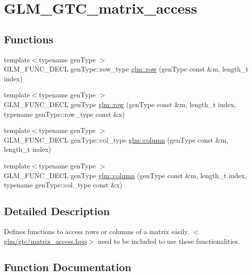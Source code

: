 \hypertarget{group__gtc__matrix__access}{}\section{G\+L\+M\+\_\+\+G\+T\+C\+\_\+matrix\+\_\+access}
\label{group__gtc__matrix__access}
\subsection*{Functions}
\begin{DoxyCompactItemize}
\item 
{\footnotesize template$<$typename gen\+Type $>$ }\\G\+L\+M\+\_\+\+F\+U\+N\+C\+\_\+\+D\+E\+CL gen\+Type\+::row\+\_\+type \hyperlink{group__gtc__matrix__access_ga259e5ebd0f31ec3f83440f8cae7f5dba}{glm\+::row} (gen\+Type const \&m, length\+\_\+t index)
\item 
{\footnotesize template$<$typename gen\+Type $>$ }\\G\+L\+M\+\_\+\+F\+U\+N\+C\+\_\+\+D\+E\+CL gen\+Type \hyperlink{group__gtc__matrix__access_gaadcc64829aadf4103477679e48c7594f}{glm\+::row} (gen\+Type const \&m, length\+\_\+t index, typename gen\+Type\+::row\+\_\+type const \&x)
\item 
{\footnotesize template$<$typename gen\+Type $>$ }\\G\+L\+M\+\_\+\+F\+U\+N\+C\+\_\+\+D\+E\+CL gen\+Type\+::col\+\_\+type \hyperlink{group__gtc__matrix__access_ga96022eb0d3fae39d89fc7a954e59b374}{glm\+::column} (gen\+Type const \&m, length\+\_\+t index)
\item 
{\footnotesize template$<$typename gen\+Type $>$ }\\G\+L\+M\+\_\+\+F\+U\+N\+C\+\_\+\+D\+E\+CL gen\+Type \hyperlink{group__gtc__matrix__access_ga9e757377523890e8b80c5843dbe4dd15}{glm\+::column} (gen\+Type const \&m, length\+\_\+t index, typename gen\+Type\+::col\+\_\+type const \&x)
\end{DoxyCompactItemize}


\subsection{Detailed Description}
Defines functions to access rows or columns of a matrix easily. $<$\hyperlink{matrix__access_8hpp}{glm/gtc/matrix\+\_\+access.\+hpp}$>$ need to be included to use these functionalities. 

\subsection{Function Documentation}
\mbox{\label{group__gtc__matrix__access_ga96022eb0d3fae39d89fc7a954e59b374}} 
